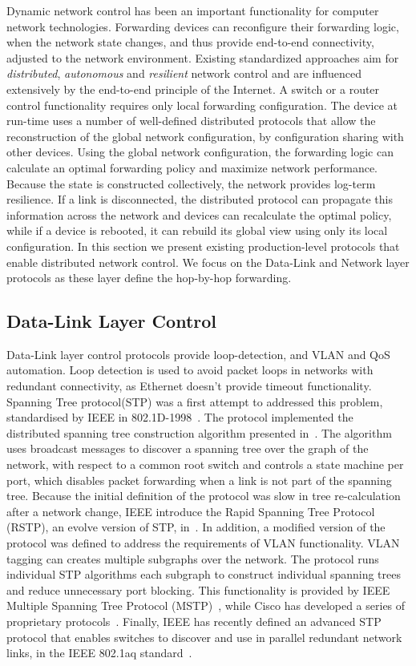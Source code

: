Dynamic network control has been an important functionality for computer network
technologies. Forwarding devices can reconfigure their forwarding logic, when the
network state changes, and thus provide end-to-end connectivity, adjusted to the network
environment. Existing standardized approaches aim for \emph{distributed},
\emph{autonomous} and \emph{resilient} network control and are influenced
extensively by the end-to-end principle of the Internet. A switch or a router
control functionality requires only local forwarding configuration. The device at 
run-time uses a number of well-defined distributed protocols that allow
the reconstruction of the global network configuration, by configuration sharing with
other devices. Using the global network configuration, the
forwarding logic can calculate an optimal forwarding policy and maximize
network performance. Because the state is constructed collectively, the network
provides log-term resilience. If a link is disconnected, the distributed
protocol can propagate this information across the network and devices can
recalculate the optimal policy, while if a device is rebooted, it can rebuild
its global view using only its local configuration. 
In this section we present
existing production-level protocols that enable distributed network control. We
focus on the Data-Link and Network layer protocols as these layer define the
hop-by-hop forwarding.

\subsection{Data-Link Layer Control}

Data-Link layer control protocols provide loop-detection, and VLAN and QoS
automation. Loop detection is used to avoid packet loops in networks with
redundant connectivity, as Ethernet doesn't provide timeout functionality.
Spanning Tree protocol(STP) was a first attempt to addressed this problem,
standardised by IEEE in 802.1D-1998~\cite{ieee_802_1d_1998}. The protocol
implemented the distributed spanning tree construction algorithm presented
in~\cite{Perlman1985}. The algorithm uses broadcast messages to discover a
spanning tree over the graph of the network, with respect to a common root
switch and controls a state machine per port, which disables packet
forwarding when a link is not part of the spanning tree.  Because the initial
definition of the protocol was slow in tree re-calculation after a network
change, IEEE introduce the Rapid Spanning Tree Protocol (RSTP), an evolve
version of STP, in~\cite{ieee_802_1d_2004}.  In addition, a modified version of
the protocol was defined to address the requirements of VLAN functionality. VLAN
tagging can creates multiple subgraphs over the network. The protocol
runs individual STP algorithms each subgraph to construct individual spanning
trees and reduce unnecessary port blocking.
This functionality is provided by IEEE Multiple Spanning Tree
Protocol (MSTP)~\cite{ieee_802_1q}, while Cisco has developed a series of
proprietary protocols~\cite{pvst,pvst+}.  Finally, IEEE has recently defined an
advanced STP protocol that enables switches to discover and use in parallel
redundant network links, in the IEEE 802.1aq standard~\cite{ieee_802_1aq}.

